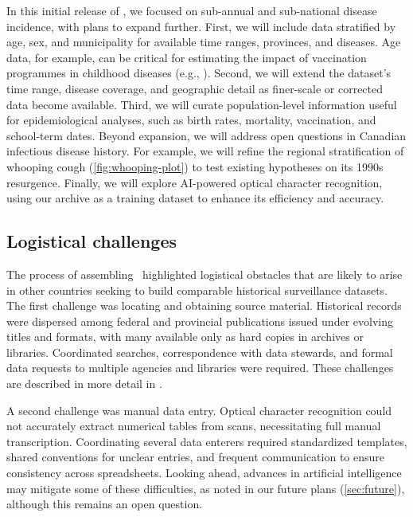 \documentclass[12pt]{article}
\begin{document}
In this initial release of \datacronym, we focused on sub-annual and sub-national disease incidence, with plans to expand further. First, we will include data stratified by age, sex, and municipality for available time ranges, provinces, and diseases. Age data, for example, can be critical for estimating the impact of vaccination programmes in childhood diseases (e.g., \cite{wilkinson2022impact}). Second, we will extend the dataset's time range, disease coverage, and geographic detail as finer-scale or corrected data become available. Third, we will curate population-level information useful for epidemiological analyses, such as birth rates, mortality, vaccination, and school-term dates. Beyond expansion, we will address open questions in Canadian infectious disease history. For example, we will refine the regional stratification of whooping cough (\cref{fig:whooping-plot}) to test existing hypotheses \cite{thommes2020revisiting} on its 1990s resurgence. Finally, we will explore AI-powered optical character recognition, using our archive as a training dataset to enhance its efficiency and accuracy.

\subsection{Logistical challenges}\label{sec:logistics}

The process of assembling \datacronym\ highlighted logistical obstacles that are likely to arise in other countries seeking to build comparable historical surveillance datasets. The first challenge was locating and obtaining source material. Historical records were dispersed among federal and provincial publications issued under evolving titles and formats, with many available only as hard copies in archives or libraries. Coordinated searches, correspondence with data stewards, and formal data requests to multiple agencies and libraries were required. These challenges are described in more detail in .

A second challenge was manual data entry. Optical character recognition could not accurately extract numerical tables from scans, necessitating full manual transcription. Coordinating several data enterers required standardized templates, shared conventions for unclear entries, and frequent communication to ensure consistency across spreadsheets. Looking ahead, advances in artificial intelligence may mitigate some of these difficulties, as noted in our future plans (\cref{sec:future}), although this remains an open question.
\end{document}
